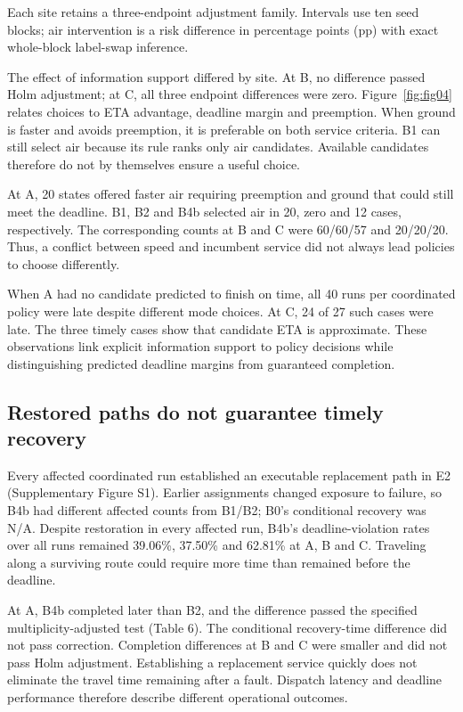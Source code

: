 \documentclass[]{interact}
\theoremstyle{plain}
\theoremstyle{definition}
\theoremstyle{remark}
\begin{document}
Each site retains a three-endpoint adjustment family. Intervals use ten seed blocks; air intervention is a risk difference in percentage points (pp) with exact whole-block label-swap inference.

The effect of information support differed by site. At B, no difference passed Holm adjustment; at C, all three endpoint differences were zero. Figure~\ref{fig:fig04} relates choices to ETA advantage, deadline margin and preemption. When ground is faster and avoids preemption, it is preferable on both service criteria. B1 can still select air because its rule ranks only air candidates. Available candidates therefore do not by themselves ensure a useful choice.

At A, 20 states offered faster air requiring preemption and ground that could still meet the deadline. B1, B2 and B4b selected air in 20, zero and 12 cases, respectively. The corresponding counts at B and C were 60/60/57 and 20/20/20. Thus, a conflict between speed and incumbent service did not always lead policies to choose differently.

When A had no candidate predicted to finish on time, all 40 runs per coordinated policy were late despite different mode choices. At C, 24 of 27 such cases were late. The three timely cases show that candidate ETA is approximate. These observations link explicit information support to policy decisions while distinguishing predicted deadline margins from guaranteed completion.

\subsection{Restored paths do not guarantee timely recovery}

Every affected coordinated run established an executable replacement path in E2 (Supplementary Figure S1). Earlier assignments changed exposure to failure, so B4b had different affected counts from B1/B2; B0's conditional recovery was N/A. Despite restoration in every affected run, B4b's deadline-violation rates over all runs remained 39.06\%, 37.50\% and 62.81\% at A, B and C. Traveling along a surviving route could require more time than remained before the deadline.

At A, B4b completed later than B2, and the difference passed the specified multiplicity-adjusted test (Table 6). The conditional recovery-time difference did not pass correction. Completion differences at B and C were smaller and did not pass Holm adjustment. Establishing a replacement service quickly does not eliminate the travel time remaining after a fault. Dispatch latency and deadline performance therefore describe different operational outcomes.
\end{document}
